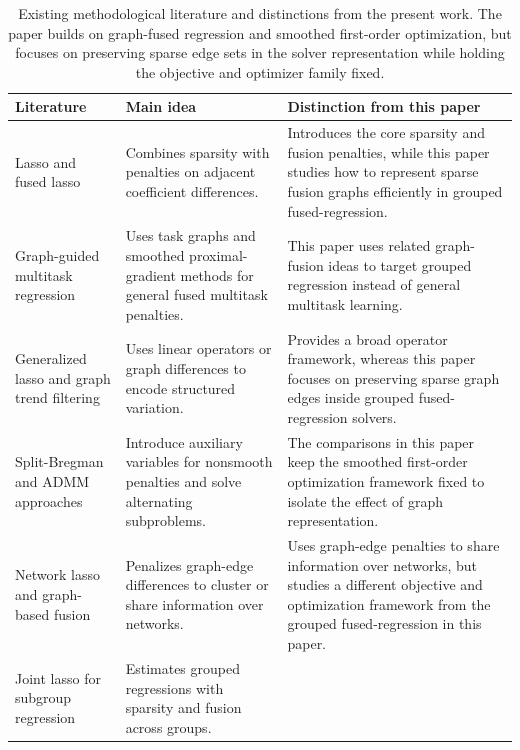 \documentclass[twoside,11pt]{article}
\begin{document}
\begin{table}[t]
\centering
\scriptsize
\caption{Existing methodological literature and distinctions from the present work.
The paper builds on graph-fused regression and smoothed first-order optimization, but focuses on preserving sparse edge sets in the solver representation while holding the objective and optimizer family fixed.}
\label{tab:literature-comparison}
{\setlength{\tabcolsep}{3pt}
\renewcommand{\arraystretch}{1.5}
\begin{tabular}{@{}>{\raggedright\arraybackslash}p{}
>{\raggedright\arraybackslash}p{}
>{\raggedright\arraybackslash}p{}@{}}
\toprule
Literature & Main idea & Distinction from this paper \\
\midrule
Lasso and fused lasso \citep{tibshirani1996lasso,tibshirani2005fused} &
Combines sparsity with penalties on adjacent coefficient differences. &
Introduces the core sparsity and fusion penalties, while this paper studies how to represent sparse fusion graphs efficiently in grouped fused-regression. \\
Graph-guided multitask regression \citep{chen2010graph,chen2012smoothing,chen2012twograph} &
Uses task graphs and smoothed proximal-gradient methods for general fused multitask penalties. &
This paper uses related graph-fusion ideas to target grouped regression instead of general multitask learning. \\
Generalized lasso and graph trend filtering \citep{tibshirani2011genlasso,wang2016graphtf} &
Uses linear operators or graph differences to encode structured variation. &
Provides a broad operator framework, whereas this paper focuses on preserving sparse graph edges inside grouped fused-regression solvers. \\
Split-Bregman and ADMM approaches \citep{ye2011split,boyd2011admm} &
Introduce auxiliary variables for nonsmooth penalties and solve alternating subproblems. &
The comparisons in this paper keep the smoothed first-order optimization framework fixed to isolate the effect of graph representation. \\
Network lasso and graph-based fusion \citep{hallac2015network} &
Penalizes graph-edge differences to cluster or share information over networks. &
Uses graph-edge penalties to share information over networks, but studies a different objective and optimization framework from the grouped fused-regression in this paper. \\
Joint lasso for subgroup regression \citep{dondelinger2020joint} &
Estimates grouped regressions with sparsity and fusion across groups. &

\end{tabular}}
\end{table}
\end{document}
